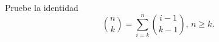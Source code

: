 \begin{statement}{2}
  Pruebe la identidad
  \[
    \binom{n}{k} = \sum_{i = k}^n \binom{i - 1}{k - 1},\, n \geq k.  
  \]
\end{statement}